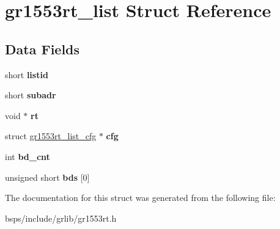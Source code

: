 \hypertarget{structgr1553rt__list}{}\section{gr1553rt\+\_\+list Struct Reference}
\label{structgr1553rt__list}
\subsection*{Data Fields}
\begin{DoxyCompactItemize}
\item 
\mbox{\label{structgr1553rt__list_a51bc3696924d243fc5a13c4d8b38fece}} 
short {\bfseries listid}
\item 
\mbox{\label{structgr1553rt__list_aa82c994a1711e0df46a5a2836f4dd42e}} 
short {\bfseries subadr}
\item 
\mbox{\label{structgr1553rt__list_ad7d61a1905b5768a7835696324472821}} 
void $\ast$ {\bfseries rt}
\item 
\mbox{\label{structgr1553rt__list_a382522f50c3dede9cbf746d7749128e0}} 
struct \mbox{\hyperlink{structgr1553rt__list__cfg}{gr1553rt\+\_\+list\+\_\+cfg}} $\ast$ {\bfseries cfg}
\item 
\mbox{\label{structgr1553rt__list_a99227cc171c520a68619a1a83b1c1f3d}} 
int {\bfseries bd\+\_\+cnt}
\item 
\mbox{\label{structgr1553rt__list_a3a8076682dc97458948f4233bd5c571b}} 
unsigned short {\bfseries bds} \mbox{[}0\mbox{]}
\end{DoxyCompactItemize}


The documentation for this struct was generated from the following file\+:\begin{DoxyCompactItemize}
\item 
bsps/include/grlib/gr1553rt.\+h\end{DoxyCompactItemize}
